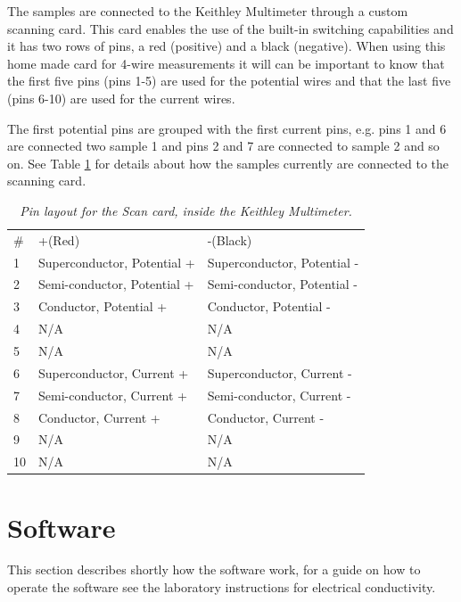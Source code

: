 \documentclass[a4paper,12pt]{article}
\begin{document}
The samples are connected to the Keithley Multimeter through a custom scanning card. This card enables the use of the built-in switching capabilities and it has two rows of pins, a red (positive) and a black (negative). When using this home made card for 4-wire measurements it will can be important to know that the first five pins (pins 1-5) are used for the potential wires and that the  last five (pins 6-10) are used for the current wires.

The first potential pins are grouped with the first current pins, e.g. pins 1 and 6 are connected two sample 1 and pins 2 and 7 are connected to sample 2 and so on. See Table \ref{tab:ScanCard} for details about how the samples currently are connected to the scanning card.
 
 
 \begin{table}[H]
	\center
	
	\caption{\emph{Pin layout for the Scan card, inside the Keithley Multimeter.}} 
	\begin{tabular}{l|l|l}
	\label{tab:ScanCard}
		\#  & +(Red) & -(Black) \\
		1  & Superconductor, Potential +	& Superconductor, Potential - \\
		2  & Semi-conductor, Potential +		& Semi-conductor, Potential - \\
		3  & Conductor, Potential +			& Conductor, Potential - \\
		4  & 	N/A	& N/A \\
		5  & 	N/A	& N/A \\
		6  & Superconductor, Current +		& Superconductor, Current - \\
		7  & Semi-conductor, Current +		& Semi-conductor, Current - \\
		8  & Conductor, Current +			& Conductor, Current - \\
		9  & 	N/A	& N/A \\
		10 & 	N/A	& N/A \\
	\end{tabular}
	
\end{table}

\section{Software}

This section describes shortly how the software work, for a guide on how to operate the software see the laboratory instructions for electrical conductivity. 
\end{document}
